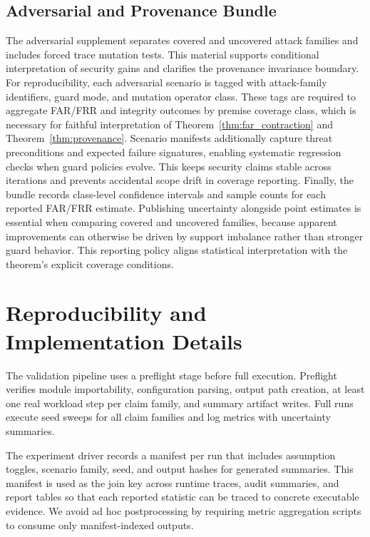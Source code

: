 \documentclass{article} %
\begin{document}
\subsection{Adversarial and Provenance Bundle}
\label{app:security_bundle}
The adversarial supplement separates covered and uncovered attack families and includes forced trace mutation tests. This material supports conditional interpretation of security gains and clarifies the provenance invariance boundary.
For reproducibility, each adversarial scenario is tagged with attack-family identifiers, guard mode, and mutation operator class. These tags are required to aggregate FAR/FRR and integrity outcomes by premise coverage class, which is necessary for faithful interpretation of Theorem~\ref{thm:far_contraction} and Theorem~\ref{thm:provenance}.
Scenario manifests additionally capture threat preconditions and expected failure signatures, enabling systematic regression checks when guard policies evolve. This keeps security claims stable across iterations and prevents accidental scope drift in coverage reporting.
Finally, the bundle records class-level confidence intervals and sample counts for each reported FAR/FRR estimate. Publishing uncertainty alongside point estimates is essential when comparing covered and uncovered families, because apparent improvements can otherwise be driven by support imbalance rather than stronger guard behavior. This reporting policy aligns statistical interpretation with the theorem's explicit coverage conditions.

\section{Reproducibility and Implementation Details}
\label{app:repro}
The validation pipeline uses a preflight stage before full execution. Preflight verifies module importability, configuration parsing, output path creation, at least one real workload step per claim family, and summary artifact writes. Full runs execute seed sweeps for all claim families and log metrics with uncertainty summaries.

The experiment driver records a manifest per run that includes assumption toggles, scenario family, seed, and output hashes for generated summaries. This manifest is used as the join key across runtime traces, audit summaries, and report tables so that each reported statistic can be traced to concrete executable evidence. We avoid ad hoc postprocessing by requiring metric aggregation scripts to consume only manifest-indexed outputs.
\end{document}
